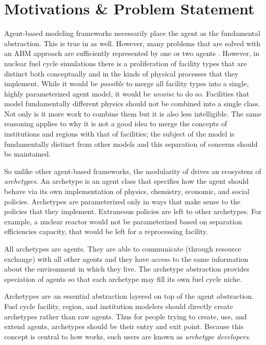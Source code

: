 \section{Motivations \& Problem Statement}
\label{sec-motive}

Agent-based modeling frameworks necessarily place the agent as the fundamental 
abstraction. This is true in \cyclus as well. However, many problems that are 
solved with an \gls{ABM} approach are sufficiently represented by one or two 
agents \cite{taylor2014agent}. However, in nuclear fuel cycle simulations there is
a proliferation of facility types that are distinct both conceptually and in the 
kinds of physical processes that they implement. While it would be \emph{possible}
to merge all facility types into a single, highly parameterized agent model,
it would be \emph{unwise} to do so. Facilities that model fundamentally different
physics should not be combined into a single class. Not only is it more work to 
combine them but it is also less intelligible. The same reasoning applies to why it is 
not a good idea to merge the concepts of institutions and regions with that of
facilities; the subject of the model is fundamentally distinct from other models
and this separation of concerns should be maintained.

So unlike other agent-based frameworks, the modularity of \cyclus drives 
an ecosystem of \emph{archetypes}. An archetype is an agent class that specifies 
how the agent should behave via its own implementation of physics, chemistry, 
economic, and social policies. Archetypes are parameterized only in ways that 
make sense to the policies that they implement. Extraneous policies are left to 
other archetypes. For example, a nuclear reactor would not be parameterized based 
on separation efficiencies capacity, that would be left for a reprocessing facility.

All archetypes are agents. They are able to communicate (through resource 
exchange) with all other agents and they have access to the same information 
about the environment in which they live. The archetype abstraction provides
speciation of agents so that each archetype may fill its own fuel cycle niche.

Archetypes are an essential abstraction layered on top of the agent abstraction. 
Fuel cycle facility, region, and institution modelers should directly create
archetypes rather than raw agents. Thus for people trying to create, use, and 
extend \cyclus agents, archetypes should be their entry and exit point. Because this 
concept is central to how \cyclus works, such users are known as \emph{archetype
developers}.

